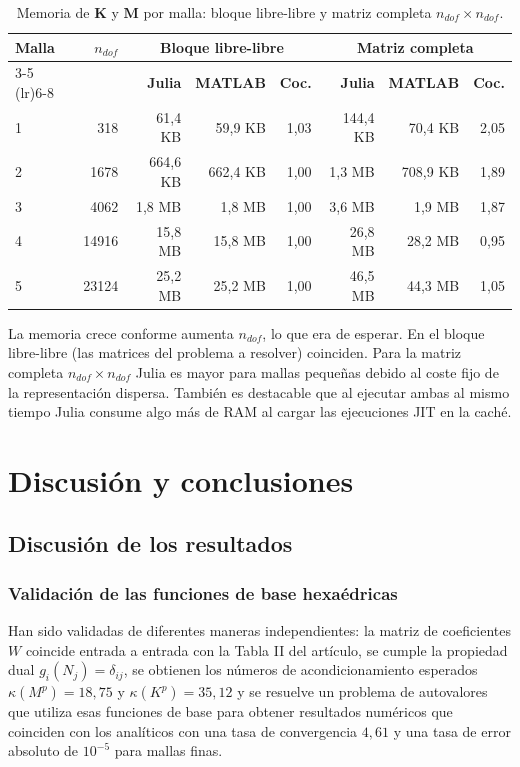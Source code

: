 \documentclass[12pt]{report} %
\begin{document}
\begin{table}[htbp]
	\centering
	\caption{Memoria de $\mathbf{K}$ y $\mathbf{M}$ por malla: bloque libre-libre y matriz completa $n_{dof}\times n_{dof}$.}
	\label{tab:memoria}
	\begin{tabular}{lrrrrrrr}
		\toprule
		\textbf{Malla} & \textbf{$n_{dof}$} &
		\multicolumn{3}{c}{\textbf{Bloque libre-libre}} &
		\multicolumn{3}{c}{\textbf{Matriz completa}} \\
		\cmidrule(lr){3-5} \cmidrule(lr){6-8}
		& & \textbf{Julia} & \textbf{MATLAB} & \textbf{Coc.} &
		\textbf{Julia} & \textbf{MATLAB} & \textbf{Coc.} \\
		\midrule
		1 & 318 & 61,4 KB & 59,9 KB & 1,03 & 144,4 KB & 70,4 KB & 2,05 \\
		2 & 1678 & 664,6 KB & 662,4 KB & 1,00 & 1,3 MB & 708,9 KB & 1,89 \\
		3 & 4062 & 1,8 MB & 1,8 MB & 1,00 & 3,6 MB & 1,9 MB & 1,87 \\
		4 & 14916 & 15,8 MB & 15,8 MB & 1,00 & 26,8 MB & 28,2 MB & 0,95 \\
		5 & 23124 & 25,2 MB & 25,2 MB & 1,00 & 46,5 MB & 44,3 MB & 1,05 \\
		\bottomrule
	\end{tabular}
\end{table}

La memoria crece conforme aumenta $n_{dof}$, lo que era de esperar. En el bloque libre-libre (las matrices del problema a resolver) coinciden. Para la matriz completa $n_{dof}\times n_{dof}$  Julia es mayor para mallas pequeñas debido al coste fijo de la representación dispersa. También es destacable que al ejecutar ambas al mismo tiempo Julia consume algo más de RAM al cargar las ejecuciones JIT en la caché.

\chapter{Discusión y conclusiones}\label{cap:conclusiones}

\section{Discusión de los resultados}\label{sec:discusion}
\subsection{Validación de las funciones de base hexaédricas}
Han sido validadas de diferentes maneras independientes: la matriz de coeficientes $W$ coincide entrada a entrada con la Tabla II del artículo, se cumple la propiedad dual $g_i(N_j)=\delta_{ij}$, se obtienen los números de acondicionamiento esperados $\kappa(M^p)=18{,}75$ y $\kappa(K^p)=35{,}12$ y se resuelve un problema de autovalores que utiliza esas funciones de base para obtener resultados numéricos que coinciden con los analíticos con una tasa de convergencia $4{,}61$ y una tasa de error absoluto de $10^{-5}$ para mallas finas.
\end{document}
